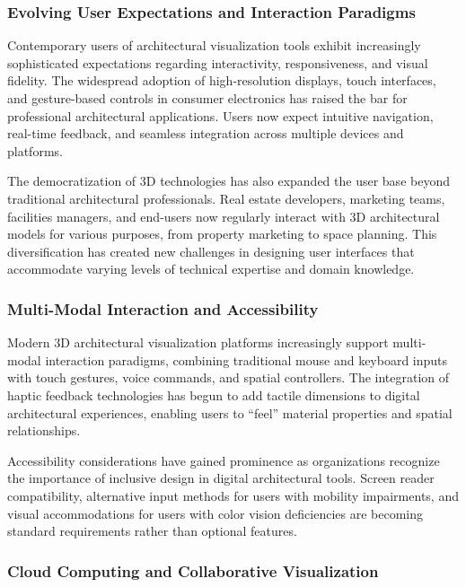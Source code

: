 \subsubsection{Evolving User Expectations and Interaction Paradigms}
\label{subsubsec:evolving_expectations}

Contemporary users of architectural visualization tools exhibit increasingly sophisticated expectations regarding interactivity, responsiveness, and visual fidelity. The widespread adoption of high-resolution displays, touch interfaces, and gesture-based controls in consumer electronics has raised the bar for professional architectural applications. Users now expect intuitive navigation, real-time feedback, and seamless integration across multiple devices and platforms.

The democratization of 3D technologies has also expanded the user base beyond traditional architectural professionals. Real estate developers, marketing teams, facilities managers, and end-users now regularly interact with 3D architectural models for various purposes, from property marketing to space planning. This diversification has created new challenges in designing user interfaces that accommodate varying levels of technical expertise and domain knowledge.

\subsubsection{Multi-Modal Interaction and Accessibility}
\label{subsubsec:multimodal_interaction}

Modern 3D architectural visualization platforms increasingly support multi-modal interaction paradigms, combining traditional mouse and keyboard inputs with touch gestures, voice commands, and spatial controllers. The integration of haptic feedback technologies has begun to add tactile dimensions to digital architectural experiences, enabling users to ``feel'' material properties and spatial relationships.

Accessibility considerations have gained prominence as organizations recognize the importance of inclusive design in digital architectural tools. Screen reader compatibility, alternative input methods for users with mobility impairments, and visual accommodations for users with color vision deficiencies are becoming standard requirements rather than optional features.

\subsubsection{Cloud Computing and Collaborative Visualization}
\label{subsubsec:cloud_collaborative}

